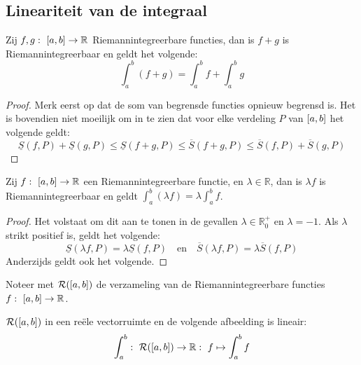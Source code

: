 \documentclass[main.tex]{subfiles}
\begin{document}
\subsection{Lineariteit van de integraal}
\label{sec:lineariteit-van-de}

\begin{bpr}
  \label{pr:optelling-behoudt-integreerbaarheid}
  Zij $f,g:\ \interval{a}{b} \rightarrow \mathbb{R}$ Riemannintegreerbare functies, dan is $f+g$ is Riemannintegreerbaar en geldt het volgende:
  \[ \int_{a}^{b}(f+g) = \int_{a}^{b}f + \int_{a}^{b}g \]

  \begin{proof}
    Merk eerst op dat de som van begrensde functies opnieuw begrensd is.
    Het is bovendien niet moeilijk om in te zien dat voor elke verdeling $P$ van $\interval{a}{b}$ het volgende geldt:
    \[ \underline{S}(f,P) + \underline{S}(g,P) \le \underline{S}(f+g,P) \le \overline{S}(f+g,P) \le \overline{S}(f,P) + \overline{S}(g,P) \]
  \end{proof}
\end{bpr}

\begin{bpr}
  Zij $f:\ \interval{a}{b} \rightarrow \mathbb{R}$ een Riemannintegreerbare functie, en $\lambda \in \mathbb{R}$, dan is $\lambda f$ is Riemannintegreerbaar en geldt $\int_{a}^{b}(\lambda f) = \lambda \int_{a}^{b}f$.

  \begin{proof}
    Het volstaat om dit aan te tonen in de gevallen $\lambda \in\mathbb{R}_{0}^{+}$ en $\lambda = -1$.
    Als $\lambda$ strikt positief is, geldt het volgende:
    \[ \underline{S}(\lambda f,P) = \lambda \underline{S}(f,P) \quad\text{en}\quad \overline{S}(\lambda f,P) = \lambda \overline{S}(f,P) \]
    Anderzijds geldt ook het volgende.
  \end{proof}
\end{bpr}

\begin{de}
  Noteer met $\mathcal{R}(\interval{a}{b})$ de verzameling van de Riemannintegreerbare functies $f:\ \interval{a}{b} \rightarrow \mathbb{R}$.
\end{de}

\begin{bgev}
  $\mathcal{R}(\interval{a}{b})$ in een re\"ele vectorruimte en de volgende afbeelding is lineair:
  \[ \int_{a}^{b}:\ \mathcal{R}(\interval{a}{b}) \rightarrow \mathbb{R}:\ f \mapsto \int_{a}^{b}f \]
\end{bgev}
\end{document}
